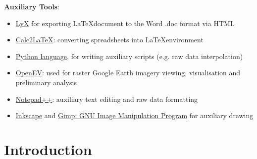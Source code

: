 \documentclass[11pt]{article}
\begin{document}
	\vspace{1ex}
	\textbf{Auxiliary Tools}:
	\begin{itemize}
		\item \href{http://www.lyx.org/}{LyX} for exporting \LaTeX document to the Word .doc format via HTML
		\item \href{http://calc2latex.sourceforge.net/}{Calc2LaTeX}: converting spreadsheets into \LaTeX environment
		\item \href{http://www.python.org/}{Python language}, for writing auxiliary scripts (e.g. raw data interpolation)
		\item \href{http://openev.sourceforge.net/}{OpenEV}: used for raster Google Earth imagery viewing, visualisation and preliminary analysis
		\item \href{http://www.notepad-plus-plus.org/}{Notepad++}: auxiliary text editing and raw data formatting
		\item \href{http://inkscape.org/}{Inkscape} and \href{http://www.gimp.org/}{Gimp: GNU Image Manipulation Program} for auxiliary drawing
	\end{itemize}
	
\pagebreak

\section*{}
\setcounter{lofdepth}{2}
\onehalfspacing
\listoffigures
\pagebreak

\section*{}
\listoftables
\pagebreak

\section{Introduction}\label{sec:1}

\end{document}
